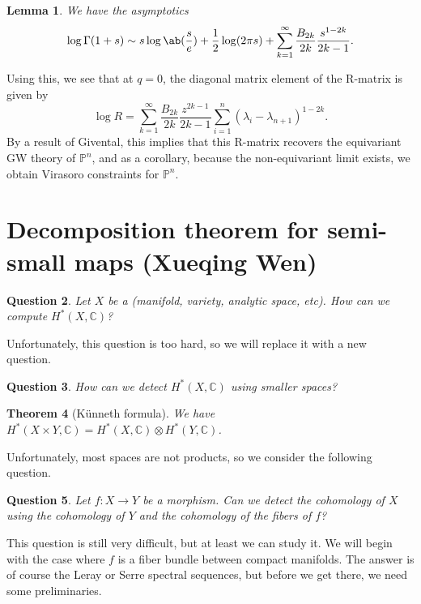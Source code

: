 \documentclass{amsart}
\newtheorem{thm}{Theorem}[section]
\newtheorem{lem}[thm]{Lemma}
\newtheorem{quest}[thm]{Question}
\theoremstyle{definition}
\theoremstyle{remark}
\theoremstyle{plain}
\theoremstyle{definition}
\theoremstyle{remark}
\newcommand{\C}{\mathbb{C}}
\renewcommand{\P}{\mathbb{P}}
\newcommand{\1}{\mathbf{1}}
\newcommand{\2}{\mathbf{2}}
\newcommand{\3}{\mathbf{3}}
\begin{document}
\begin{lem}
    We have the asymptotics
    \[ \log \Gamma(1+s) \sim s \log \ab(\frac{s}{e}) + \frac{1}{2} \log(2\pi s) + \sum_{k=1}^{\infty} \frac{B_{2k}}{2k} \frac{s^{1-2k}}{2k-1}. \]
\end{lem}
Using this, we see that at \(q = 0\), the diagonal matrix element of the R-matrix is given by
\[ \log R = \sum_{k=1}^{\infty} \frac{B_{2k}}{2k} \frac{z^{2k-1}}{2k-1} \sum_{i =1}^n (\lambda_i - \lambda_{n+1})^{1-2k}. \]
By a result of Givental, this implies that this R-matrix recovers the equivariant GW theory of \(\P^n\), and as a corollary, because the non-equivariant limit exists, we obtain Virasoro constraints for \(\P^n\). 

\section{Decomposition theorem for semi-small maps (Xueqing Wen)}%
\label{sec:Decomposition theorem for semi-small maps (Xueqing Wen)}

\begin{quest}
    Let \(X\) be a (manifold, variety, analytic space, etc). How can we compute \(H^*(X, \C)\)?
\end{quest}

Unfortunately, this question is too hard, so we will replace it with a new question.

\begin{quest}
    How can we detect \(H^*(X, \C)\) using smaller spaces?
\end{quest}

\begin{thm}[K\"unneth formula]
    We have \(H^*(X \times Y, \C) = H^*(X, \C) \otimes H^*(Y, \C)\).
\end{thm}

Unfortunately, most spaces are not products, so we consider the following question.

\begin{quest}
    Let \(f \colon X \to Y\) be a morphism. Can we detect the cohomology of \(X\) using the cohomology of \(Y\) and the cohomology of the fibers of \(f\)?
\end{quest}

This question is still very difficult, but at least we can study it. We will begin with the case where \(f\) is a fiber bundle between compact manifolds. The answer is of course the Leray or Serre spectral sequences, but before we get there, we need some preliminaries.
\end{document}
